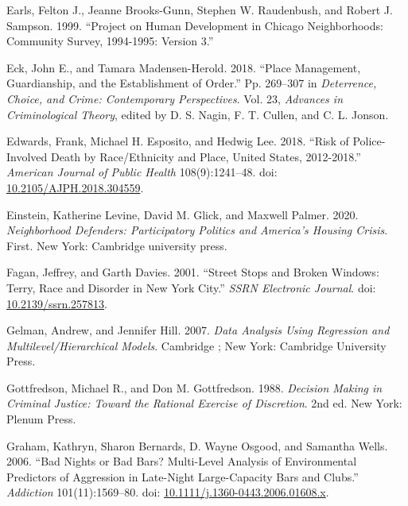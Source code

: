 \documentclass [11pt, proquest] {uwthesis}[2015/03/03]
\newlength{\cslhangindent}
\newenvironment{CSLReferences}[2]%
{\setlength{\parindent}{0pt}%
\everypar{\setlength{\hangindent}{\cslhangindent}}\ignorespaces}%
{\par}
\begin{document}
\begin{CSLReferences}{1}{0}
\leavevmode\hypertarget{ref-earlsProjectHumanDevelopment1999}{}%
Earls, Felton J., Jeanne Brooks-Gunn, Stephen W. Raudenbush, and Robert J. Sampson. 1999. {``Project on {Human Development} in {Chicago Neighborhoods}: {Community Survey}, 1994-1995: {Version} 3.''}

\leavevmode\hypertarget{ref-eckPlaceManagementGuardianship2018}{}%
Eck, John E., and Tamara Madensen-Herold. 2018. {``Place {Management}, {Guardianship}, and the {Establishment} of {Order}.''} Pp. 269--307 in \emph{Deterrence, {Choice}, and {Crime}: {Contemporary Perspectives}}. Vol. 23, \emph{Advances in {Criminological Theory}}, edited by D. S. Nagin, F. T. Cullen, and C. L. Jonson.

\leavevmode\hypertarget{ref-edwardsRiskPoliceInvolvedDeath2018}{}%
Edwards, Frank, Michael H. Esposito, and Hedwig Lee. 2018. {``Risk of {Police}-{Involved Death} by {Race}/{Ethnicity} and {Place}, {United States}, 2012-2018.''} \emph{American Journal of Public Health} 108(9):1241--48. doi: \href{https://doi.org/10.2105/AJPH.2018.304559}{10.2105/AJPH.2018.304559}.

\leavevmode\hypertarget{ref-einsteinNeighborhoodDefendersParticipatory2020}{}%
Einstein, Katherine Levine, David M. Glick, and Maxwell Palmer. 2020. \emph{Neighborhood {Defenders}: {Participatory Politics} and {America}'s {Housing Crisis}}. First. {New York}: {Cambridge university press}.

\leavevmode\hypertarget{ref-faganStreetStopsBroken2001}{}%
Fagan, Jeffrey, and Garth Davies. 2001. {``Street {Stops} and {Broken Windows}: {Terry}, {Race} and {Disorder} in {New York City}.''} \emph{SSRN Electronic Journal}. doi: \href{https://doi.org/10.2139/ssrn.257813}{10.2139/ssrn.257813}.

\leavevmode\hypertarget{ref-gelmanDataAnalysisUsing2007}{}%
Gelman, Andrew, and Jennifer Hill. 2007. \emph{Data {Analysis Using Regression} and {Multilevel}/{Hierarchical Models}}. {Cambridge ; New York}: {Cambridge University Press}.

\leavevmode\hypertarget{ref-gottfredsonDecisionMakingCriminal1988}{}%
Gottfredson, Michael R., and Don M. Gottfredson. 1988. \emph{Decision Making in Criminal Justice: Toward the Rational Exercise of Discretion}. 2nd ed. {New York}: {Plenum Press}.

\leavevmode\hypertarget{ref-grahamBadNightsBad2006}{}%
Graham, Kathryn, Sharon Bernards, D. Wayne Osgood, and Samantha Wells. 2006. {``Bad Nights or Bad Bars? {Multi}-Level Analysis of Environmental Predictors of Aggression in Late-Night Large-Capacity Bars and Clubs.''} \emph{Addiction} 101(11):1569--80. doi: \href{https://doi.org/10.1111/j.1360-0443.2006.01608.x}{10.1111/j.1360-0443.2006.01608.x}.


\end{CSLReferences}
\end{document}
